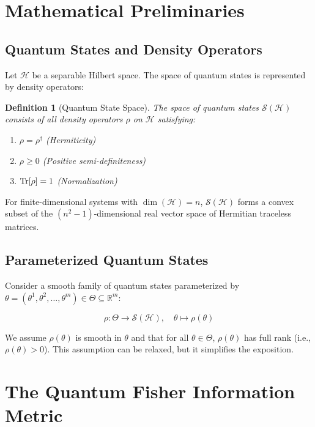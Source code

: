 \documentclass[12pt,a4paper]{article}
\newtheorem{definition}{Definition}
\begin{document}
\section{Mathematical Preliminaries}

\subsection{Quantum States and Density Operators}

Let $\mathcal{H}$ be a separable Hilbert space. The space of quantum states is represented by density operators:

\begin{definition}[Quantum State Space]
The space of quantum states $\mathcal{S}(\mathcal{H})$ consists of all density operators $\rho$ on $\mathcal{H}$ satisfying:
\begin{enumerate}
\item $\rho = \rho^\dagger$ (Hermiticity)
\item $\rho \geq 0$ (Positive semi-definiteness)
\item $\Tr[\rho] = 1$ (Normalization)
\end{enumerate}
\end{definition}

For finite-dimensional systems with $\dim(\mathcal{H}) = n$, $\mathcal{S}(\mathcal{H})$ forms a convex subset of the $(n^2-1)$-dimensional real vector space of Hermitian traceless matrices.

\subsection{Parameterized Quantum States}

Consider a smooth family of quantum states parameterized by $\theta = (\theta^1, \theta^2, \ldots, \theta^m) \in \Theta \subseteq \mathbb{R}^m$:

\begin{equation}
\rho: \Theta \rightarrow \mathcal{S}(\mathcal{H}), \quad \theta \mapsto \rho(\theta)
\end{equation}

We assume $\rho(\theta)$ is smooth in $\theta$ and that for all $\theta \in \Theta$, $\rho(\theta)$ has full rank (i.e., $\rho(\theta) > 0$). This assumption can be relaxed, but it simplifies the exposition.

\section{The Quantum Fisher Information Metric}
\end{document}

